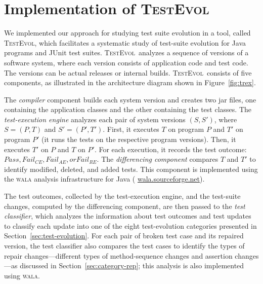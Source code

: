 \documentclass[conference]{IEEEtran}
\newcommand{\lang}[1]{\texttt{\small #1}}
\newcommand{\mt}{\mathit}
\newcommand{\pass}{\mt{Pass}}
\newcommand{\failce}{\mt{Fail}_{CE}}
\newcommand{\failre}{\mt{Fail}_{RE}}
\newcommand{\failae}{\mt{Fail}_{AE}}
\newcommand{\tool}{\textsc{TestEvol}\xspace}
\begin{document}


\section{Implementation of \tool}
\label{sec:implementation}




We implemented our approach for studying test suite evolution in a
tool, called \tool, which facilitates a systematic study of test-suite
evolution for Java programs and JUnit test suites.  \tool\ analyzes a
sequence of versions of a software system, where each version consists
of application code and test code. The versions can be actual releases
or internal builds.  \tool\ consists of five components, as
illustrated in the architecture diagram shown in
Figure~\ref{fig:trex}.

The \emph{compiler} component builds each system version and creates
two jar files, one containing the application classes and the other
containing the test classes.
%
The \emph{test-execution engine} analyzes each pair of system versions
$(S, S')$, where $S = (P, T)$ and $S' = (P', T')$.  First, it executes
$T$ on program $P$ and $T'$ on program $P'$ (\ie it runs the tests on
the respective program versions).  Then, it executes $T'$ on $P$ and
$T$ on $P'$. For each execution, it records the test outcome: $\pass,
\failce, \failae, or \failre$.
%
The \emph{differencing component} compares $T$ and $T'$ to identify
modified, deleted, and added tests. This component is implemented
using the \textsc{wala} analysis infrastructure for Java ({\small
  \url{wala.sourceforge.net}}).

The test outcomes, collected by the test-execution engine, and the
test-suite changes, computed by the differencing component, are then
passed to the \emph{test classifier}, which analyzes the information
about test outcomes and test updates to classify each update into one
of the eight test-evolution categories presented in
Section~\ref{sec:test-evolution}.  For each pair of broken test case
and its repaired version, the test classifier also compares the test
cases to identify the types of repair changes---different types of
method-sequence changes and assertion changes---as discussed in
Section~\ref{sec:category-rep}; this analysis is also implemented
using \textsc{wala}.
\end{document}
